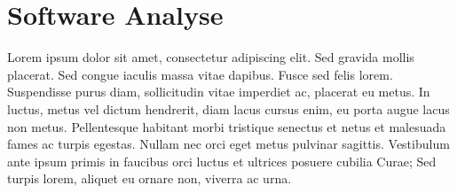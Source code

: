 \section{Software Analyse}

Lorem ipsum dolor sit amet, consectetur adipiscing elit. Sed gravida mollis placerat. Sed congue iaculis massa vitae dapibus. Fusce sed felis lorem. Suspendisse purus diam, sollicitudin vitae imperdiet ac, placerat eu metus. In luctus, metus vel dictum hendrerit, diam lacus cursus enim, eu porta augue lacus non metus. Pellentesque habitant morbi tristique senectus et netus et malesuada fames ac turpis egestas. Nullam nec orci eget metus pulvinar sagittis. Vestibulum ante ipsum primis in faucibus orci luctus et ultrices posuere cubilia Curae; Sed turpis lorem, aliquet eu ornare non, viverra ac urna.